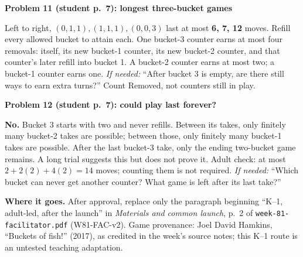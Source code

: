 \documentclass[11pt]{article}
\newcommand{\sub}[1]{\par\textbf{#1}\par}
\newcommand{\hint}[1]{\textit{If needed:} #1}
\begin{document}
\sub{Problem 11 (student p.\ 7): longest three-bucket games}
Left to right, $(0,1,1),(1,1,1),(0,0,3)$ last at most \textbf{6, 7, 12} moves. Refill every allowed bucket to attain each. One bucket-3 counter earns at most four removals: itself, its new bucket-1 counter, its new bucket-2 counter, and that counter's later refill into bucket 1. A bucket-2 counter earns at most two; a bucket-1 counter earns one. \hint{``After bucket 3 is empty, are there still ways to earn extra turns?''} Count Removed, not counters still in play.

\sub{Problem 12 (student p.\ 7): could play last forever?}
\textbf{No.} Bucket 3 starts with two and never refills. Between its takes, only finitely many bucket-2 takes are possible; between those, only finitely many bucket-1 takes are possible. After the last bucket-3 take, only the ending two-bucket game remains. A long trial suggests this but does not prove it. Adult check: at most $2+2(2)+4(2)=14$ moves; counting them is not required. \hint{``Which bucket can never get another counter? What game is left after its last take?''}

{\footnotesize \textbf{Where it goes.} After approval, replace only the paragraph beginning ``K--1, adult-led, after the launch'' in \emph{Materials and common launch}, p.\ 2 of \texttt{week-81-facilitator.pdf} (W81-FAC-v2). Game provenance: Joel David Hamkins, ``Buckets of fish!'' (2017), as credited in the week's source notes; this K--1 route is an untested teaching adaptation.}
\end{document}
